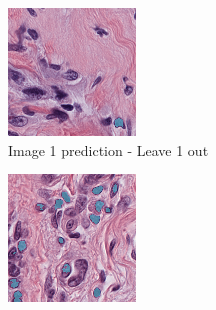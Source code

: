 \begin{figure}[H]
   \begin{subfigure}[b]{0.32\textwidth}
    \centering
    \includegraphics[width=\linewidth]{assets/images/for_presentation/exp3-1-pred-l1o.png}
    \caption{Image 1 prediction - Leave 1 out}
  \end{subfigure}\hfill
  \begin{subfigure}[b]{0.32\textwidth}
    \centering
    \includegraphics[width=\linewidth]{assets/images/for_presentation/exp3-2-pred-l1o.png}

\end{subfigure}
\end{figure}
